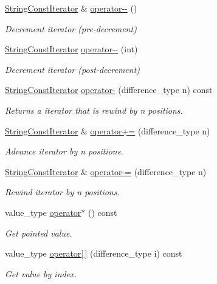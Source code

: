 \begin{DoxyCompactItemize}
\hyperlink{struct_mdt_1_1_plain_text_1_1_string_const_iterator}{String\+Const\+Iterator} \& \hyperlink{struct_mdt_1_1_plain_text_1_1_string_const_iterator_a1d923d5a9c0cb79d2b794587660ad376}{operator-\/-\/} ()
\begin{DoxyCompactList}\small\item\em Decrement iterator (pre-\/decrement) \end{DoxyCompactList}\item 
\hyperlink{struct_mdt_1_1_plain_text_1_1_string_const_iterator}{String\+Const\+Iterator} \hyperlink{struct_mdt_1_1_plain_text_1_1_string_const_iterator_ac80031fc5261a7aaf0c2229946483efb}{operator-\/-\/} (int)
\begin{DoxyCompactList}\small\item\em Decrement iterator (post-\/decrement) \end{DoxyCompactList}\item 
\hyperlink{struct_mdt_1_1_plain_text_1_1_string_const_iterator}{String\+Const\+Iterator} \hyperlink{struct_mdt_1_1_plain_text_1_1_string_const_iterator_ac7fd84c109231856126ecd9443792296}{operator-\/} (difference\+\_\+type n) const 
\begin{DoxyCompactList}\small\item\em Returns a iterator that is rewind by n positions. \end{DoxyCompactList}\item 
\hyperlink{struct_mdt_1_1_plain_text_1_1_string_const_iterator}{String\+Const\+Iterator} \& \hyperlink{struct_mdt_1_1_plain_text_1_1_string_const_iterator_a2fdef53991d8a75174f6254ad4664c08}{operator+=} (difference\+\_\+type n)
\begin{DoxyCompactList}\small\item\em Advance iterator by n positions. \end{DoxyCompactList}\item 
\hyperlink{struct_mdt_1_1_plain_text_1_1_string_const_iterator}{String\+Const\+Iterator} \& \hyperlink{struct_mdt_1_1_plain_text_1_1_string_const_iterator_a20fc6889ac0e76812a993014f4d8e13b}{operator-\/=} (difference\+\_\+type n)
\begin{DoxyCompactList}\small\item\em Rewind iterator by n positions. \end{DoxyCompactList}\item 
value\+\_\+type \hyperlink{struct_mdt_1_1_plain_text_1_1_string_const_iterator_ad23073b28d2844ad3e3555608e4a9bd5}{operator$\ast$} () const 
\begin{DoxyCompactList}\small\item\em Get pointed value. \end{DoxyCompactList}\item 
value\+\_\+type \hyperlink{struct_mdt_1_1_plain_text_1_1_string_const_iterator_a8a9673923bfd2e0af6f31b9f98ef8f46}{operator\mbox{[}$\,$\mbox{]}} (difference\+\_\+type i) const 
\begin{DoxyCompactList}\small\item\em Get value by index. \end{DoxyCompactList}\end{DoxyCompactItemize}
